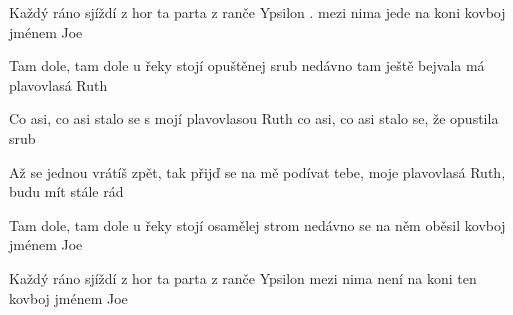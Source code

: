 
\beginverse{}
\lrep{} Každý ráno sjíždí z hor ta parta z ranče Ypsilon \rrep{}.
\lrep{} mezi nima jede na koni kovboj jménem Joe \rrep{}
\endverse{}

\beginverse{}
\chordsoff{}
\lrep{} Tam dole, tam dole u řeky stojí opuštěnej srub \rrep{}
\lrep{} nedávno tam ještě bejvala má plavovlasá Ruth \rrep{}
\chordson{}
\endverse{}

\beginverse{}
\chordsoff{}
\lrep{} Co asi, co asi stalo se s mojí plavovlasou Ruth \rrep{}
\lrep{} co asi, co asi stalo se, že opustila srub \rrep{}
\chordson{}
\endverse{}

\beginverse{}
\chordsoff{}
\lrep{} Až se jednou vrátíš zpět, tak přijď se na mě podívat \rrep{}
\lrep{} tebe, moje plavovlasá Ruth, budu mít stále rád \rrep{}
\chordson{}
\endverse{}

\beginverse{}
\chordsoff{}
\lrep{} Tam dole, tam dole u řeky stojí osamělej strom \rrep{}
\lrep{} nedávno se na něm oběsil kovboj jménem Joe \rrep{}
\chordson{}
\endverse{}

\beginverse{}
\chordsoff{}
\lrep{} Každý ráno sjíždí z hor ta parta z ranče Ypsilon \rrep{}
\lrep{} mezi nima není na koni ten kovboj jménem Joe \rrep{}
\chordson{}
\endverse{}

\endsong{}
